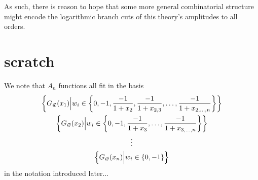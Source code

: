 \documentclass[11pt]{article}
\begin{document}
As such, there is reason to hope that some more general combinatorial structure might encode the logarithmic branch cuts of this theory's amplitudes to all orders.  






\section{scratch}



We note that $A_n$ functions all fit in the basis
\begin{gather}
\left\{G_{\vec{\hspace{.0cm} w}}(x_1) \Big| w_i \in \left\{0, - 1, \frac{-1}{1 + x_2}, \frac{-1}{1 + x_{2,3}}, \dots , \frac{-1}{1 + x_{2,\dots,n}} \right\} \right\} \nonumber \\
\left\{G_{\vec{\hspace{.0cm} w}}(x_2) \Big| w_i \in \left\{0, - 1, \frac{-1}{1 + x_3}, \dots , \frac{-1}{1 + x_{3,\dots,n}} \right\} \right\} \\
\vdots \nonumber \\ 
\left\{G_{\vec{\hspace{.0cm} w}}(x_n) \Big| w_i \in \left\{0, - 1 \right\} \right\} \nonumber
\end{gather}
in the notation introduced later...
\end{document}
